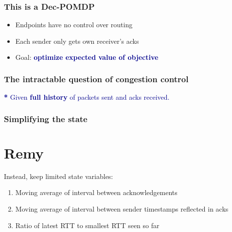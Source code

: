 \documentclass[svgnames]{beamer}
\newcommand{\ssline}{\vspace{8 pt}}
\begin{document}
\begin{frame}
\frametitle{This is a Dec-POMDP}

\Large

\begin{itemize}

\item Endpoints have no control over routing

\item Each sender only gets own receiver's acks

\item Goal: \textbf{\textcolor{DarkBlue}{optimize expected value of objective}}

\end{itemize}

\end{frame}

\begin{frame}
\frametitle{The intractable question of congestion control}

\begin{centering}

\end{centering}

\ssline
\ssline
\ssline

\pause

\large \noindent \textcolor{DarkBlue}{\textbf{*} Given {\bf full history} of packets sent and acks received.}

\end{frame}

\begin{frame}
\frametitle{Simplifying the state}

\section{Remy}

Instead, keep limited state variables:

\begin{enumerate}

\item Moving average of interval between acknowledgements

\item Moving average of interval between sender timestamps reflected in acks

\item Ratio of latest RTT to smallest RTT seen so far

\end{enumerate}

\end{frame}
\end{document}
